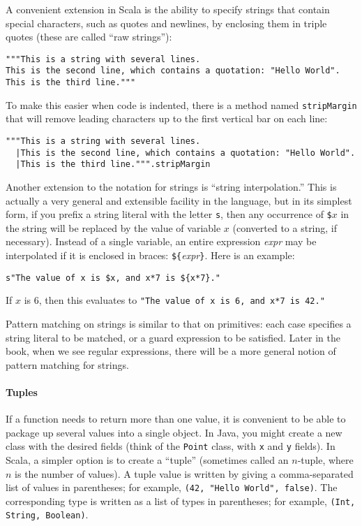 A convenient extension in Scala is the ability to specify strings that contain special characters, such as quotes and newlines, by enclosing them in triple quotes (these are called ``raw strings''):
\begin{verbatim}
"""This is a string with several lines.
This is the second line, which contains a quotation: "Hello World".
This is the third line."""
\end{verbatim}
To make this easier when code is indented, there is a method named \verb|stripMargin| that will remove leading characters up to the first vertical bar on each line:
\begin{verbatim}
"""This is a string with several lines.
  |This is the second line, which contains a quotation: "Hello World".
  |This is the third line.""".stripMargin
\end{verbatim}

Another extension to the notation for strings is ``string interpolation.'' This is actually a very general and extensible facility in the language, but in its simplest form, if you prefix a string literal with the letter \verb|s|, then any occurrence of \verb|$|$x$ in the string will be replaced by the value of variable $x$ (converted to a string, if necessary). Instead of a single variable, an entire expression \textit{expr} may be interpolated if it is enclosed in braces: \verb|${|\textit{expr}\verb|}|. Here is an example:
\begin{verbatim}
s"The value of x is $x, and x*7 is ${x*7}."
\end{verbatim}
If $x$ is 6, then this evaluates to \verb|"The value of x is 6, and x*7 is 42."|

Pattern matching on strings is similar to that on primitives: each case specifies a string literal to be matched, or a guard expression to be satisfied. Later in the book, when we see regular expressions, there will be a more general notion of pattern matching for strings.

\paragraph{Tuples}
If a function needs to return more than one value, it is convenient to be able to package up several values into a single object. In Java, you might create a new class with the desired fields (think of the \verb|Point| class, with \verb|x| and \verb|y| fields). In Scala, a simpler option is to create a ``tuple'' (sometimes called an $n$-tuple, where $n$ is the number of values). A tuple value is written by giving a comma-separated list of values in parentheses; for example, \verb|(42, "Hello World", false)|. The corresponding type is written as a list of types in parentheses; for example, \verb|(Int, String, Boolean)|.


